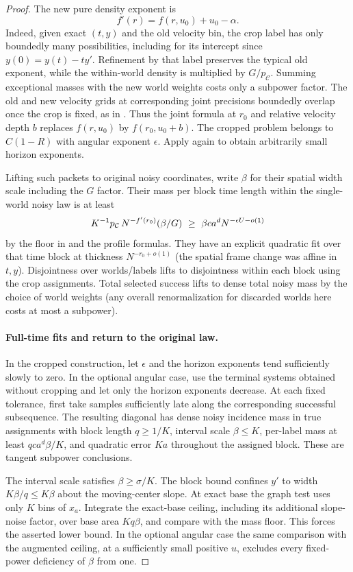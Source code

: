 \begin{proof}
The new pure density exponent is
\[
 f'(r)=f(r,u_0)+u_0-\alpha.
\]
Indeed, given exact \((t,y)\) and the old velocity bin, the crop
label has only boundedly many possibilities, including for its
intercept since \(y(0)=y(t)-ty'\).  Refinement by that label
preserves the typical old exponent, while the within-world density
is multiplied by \(G/p_{\mathcal C}\).  Summing exceptional
masses with the new world weights costs only a subpower factor.
The old and new velocity grids at corresponding joint precisions
boundedly overlap once the crop is fixed, as in
.  Thus the joint formula at \(r_0\)
and relative velocity depth \(b\) replaces \(f(r,u_0)\) by
\(f(r_0,u_0+b)\).  The cropped problem belongs to \(C(1-R)\)
with angular exponent \(\epsilon\).  Apply
 again to obtain arbitrarily small
horizon exponents.

Lifting such packets to original noisy coordinates, write \(\beta\) for their spatial width scale including the \(G\) factor. Their mass per block time length within the single-world noisy law is at least
\[
 K^{-1}p_{\cal C}\,N^{-f'(r_0)}(\beta/G)
 \ \ge\ \beta c a^d N^{-\epsilon U-o(1)}
\]
by the floor in  and the profile formulas. They have an explicit quadratic fit over that time block at thickness \(N^{-r_0+o(1)}\) (the spatial frame change was affine in \(t,y\)). Disjointness over worlds/labels lifts to disjointness within each block using the crop assignments. Total selected success lifts to dense total noisy mass by the choice of world weights (any overall renormalization for discarded worlds here costs at most a subpower).

\paragraph{Full-time fits and return to the original law.}
In the cropped construction, let \(\epsilon\) and the horizon
exponents tend sufficiently slowly to zero.  In the optional angular
case, use the terminal systems obtained without cropping and let only
the horizon exponents decrease.  At each fixed tolerance, first take
samples sufficiently late along the corresponding successful
subsequence.  The resulting diagonal has dense noisy incidence mass
in true assignments with block length \(q\ge1/K\), interval scale
\(\beta\le K\), per-label mass at least
\(qca^d\beta/K\), and quadratic error \(Ka\) throughout the
assigned block.  These are tangent subpower conclusions.

The interval scale satisfies \(\beta\ge\sigma/K\).  The block
bound confines \(y'\) to width \(K\beta/q\le K\beta\)
about the moving-center slope.  At exact base the graph test uses
only \(K\) bins of \(x_a\).  Integrate the exact-base ceiling,
including its additional slope-noise factor, over base area
\(Kq\beta\), and compare with the mass floor.  This forces the
asserted lower bound.  In the optional angular case the same
comparison with the augmented ceiling, at a sufficiently small
positive \(u\), excludes every fixed-power deficiency of \(\beta\)
from one.


\end{proof}
